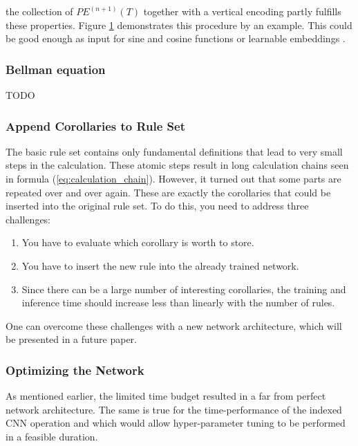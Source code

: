 \documentclass{scrartcl}
\theoremstyle{definition}
\begin{document}
the collection of $PE^{(n+1)}\left( T \right)$ together with a vertical encoding partly fulfills these properties.
Figure \ref{fig:positional_encoding} demonstrates this procedure by an example.
This could be good enough as input for sine and cosine functions or learnable embeddings \cite{gehring2017convolutional}.

\begin{figure}[!htbp]
	\centering
	
	\label{fig:positional_encoding}
\end{figure}


\subsubsection{Bellman equation}
TODO

\subsubsection{Append Corollaries to Rule Set}

The basic rule set contains only fundamental definitions that lead to very small steps in the calculation.
These atomic steps result in long calculation chains seen in formula (\ref{eq:calculation_chain}).
However, it turned out that some parts are repeated over and over again.
These are exactly the corollaries that could be inserted into the original rule set.
To do this, you need to address three challenges:

\begin{enumerate}[label=(\roman*)]
	\item You have to evaluate which corollary is worth to store.
	\item You have to insert the new rule into the already trained network.
	\item Since there can be a large number of interesting corollaries, the training and inference time should increase less than linearly with the number of rules.
\end{enumerate}

One can overcome these challenges with a new network architecture, which will be presented in a future paper.

\subsubsection{Optimizing the Network}

As mentioned earlier, the limited time budget resulted in a far from perfect network architecture.
The same is true for the time-performance of the indexed CNN operation and which would allow hyper-parameter tuning to be performed in a feasible duration.
\end{document}
